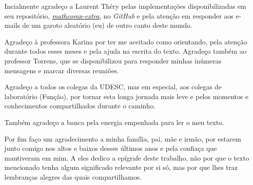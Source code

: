 \begin{agradecimentos}
	Incialmente agradeço a Laurent Théry pelas implementações disponibilizadas em seu repositório, \hyperlink{https://github.com/thery/mathcomp-extra/}{\textit{mathcomp-extra}}, no \textit{GitHub} e pela atenção em responder aos e-mails de um garoto aleatório (eu) de outro canto deste mundo.

	Agradeço à professora Karina por ter me aceitado como orientando, pela atenção durante todos esses meses e pela ajuda na escrita do texto. Agradeço também ao professor Torrens, que se disponibilizou para responder minhas inúmeras mensagens e marcar diversas reuniões.

	Agradeço a todos os colegas da UDESC, mas em especial, aos colegas de laboratório (Função), por tornar esta longa jornada mais leve e pelos momentos e conhecimentos compartilhados durante o caminho.

	Também agradeço a banca pela energia empenhada para ler o meu texto.
	
	

	Por fim faço um agradecimento a minha família, pai, mãe e irmão, por estarem junto comigo nos altos e baixos desses últimos anos e pela confiaça que mantiveram em mim. A eles dedico a epígrafe deste trabalho, não por que o texto mencionado tenha algum significado relevante por si só, mas por que lhes traz lembranças alegres das quais compartilhamos.
\end{agradecimentos}


